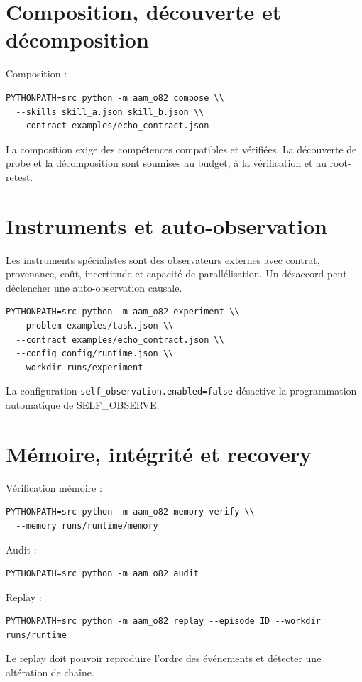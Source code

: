 \documentclass[11pt,a4paper]{report}
\begin{document}
\chapter{Composition, découverte et décomposition}
Composition :
\begin{verbatim}
PYTHONPATH=src python -m aam_o82 compose \\
  --skills skill_a.json skill_b.json \\
  --contract examples/echo_contract.json
\end{verbatim}
La composition exige des compétences compatibles et vérifiées. La découverte de probe et la décomposition sont soumises au budget, à la vérification et au root-retest.

\chapter{Instruments et auto-observation}
Les instruments spécialistes sont des observateurs externes avec contrat, provenance, coût, incertitude et capacité de parallélisation. Un désaccord peut déclencher une auto-observation causale.
\begin{verbatim}
PYTHONPATH=src python -m aam_o82 experiment \\
  --problem examples/task.json \\
  --contract examples/echo_contract.json \\
  --config config/runtime.json \\
  --workdir runs/experiment
\end{verbatim}
La configuration \texttt{self\_observation.enabled=false} désactive la programmation automatique de SELF\_OBSERVE.

\chapter{Mémoire, intégrité et recovery}
Vérification mémoire :
\begin{verbatim}
PYTHONPATH=src python -m aam_o82 memory-verify \\
  --memory runs/runtime/memory
\end{verbatim}
Audit :
\begin{verbatim}
PYTHONPATH=src python -m aam_o82 audit
\end{verbatim}
Replay :
\begin{verbatim}
PYTHONPATH=src python -m aam_o82 replay --episode ID --workdir runs/runtime
\end{verbatim}
Le replay doit pouvoir reproduire l'ordre des événements et détecter une altération de chaîne.
\end{document}
